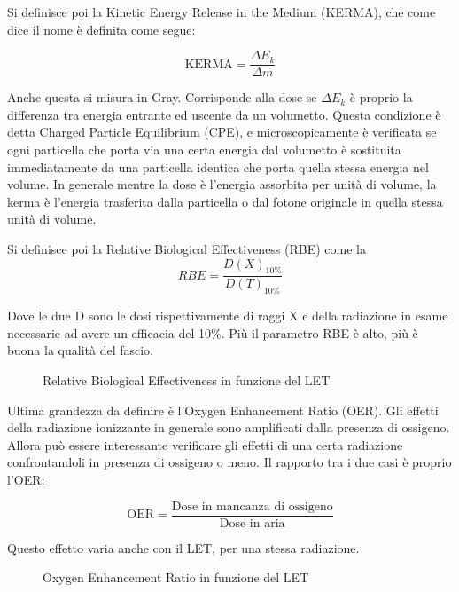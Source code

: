 \documentclass [a4paper, twoside] {book}
\begin{document}
Si definisce poi la Kinetic Energy Release in the Medium (KERMA), che come dice il nome è definita come segue:

\begin{equation}
\text{KERMA}=\frac{\Delta E_k}{\Delta m}
\end{equation}

Anche questa si misura in Gray. Corrisponde alla dose se $\Delta E_k$ è proprio la differenza tra energia entrante ed uscente da un volumetto.
Questa condizione è detta Charged Particle Equilibrium (CPE), e microscopicamente è verificata se ogni particella che porta via una certa energia dal volumetto è sostituita immediatamente da una particella identica che porta quella stessa energia nel volume. 
In generale mentre la dose è l'energia assorbita per unità di volume, la kerma è l'energia trasferita dalla particella o dal fotone originale in quella stessa unità di volume.

Si definisce poi la Relative Biological Effectiveness (RBE) come la
\begin{equation}
RBE=\frac{D(X)_{10\%}}{D(T)_{10\%}}
\end{equation}

Dove le due D sono le dosi rispettivamente di raggi X e della radiazione in esame necessarie ad avere un efficacia del 10\%. Più il parametro RBE è alto, più è buona la qualità del fascio.

\begin{figure} []
\centering
		\caption{Relative Biological Effectiveness in funzione del LET}
         \label{RBE}
\end{figure}

Ultima grandezza da definire è l'Oxygen Enhancement Ratio (OER). Gli effetti della radiazione ionizzante in generale sono amplificati dalla presenza di ossigeno. Allora può essere interessante verificare gli effetti di una certa radiazione confrontandoli in presenza di ossigeno o meno. Il rapporto tra i due casi è proprio l'OER:

\begin{equation}
\text{OER}=\frac{\text{Dose in mancanza di ossigeno}}{\text{Dose in aria}}
\end{equation}

Questo effetto varia anche con il LET, per una stessa radiazione.

\begin{figure} []
\centering
		\caption{Oxygen Enhancement Ratio in funzione del LET}
         \label{OER}
\end{figure}
\end{document}
